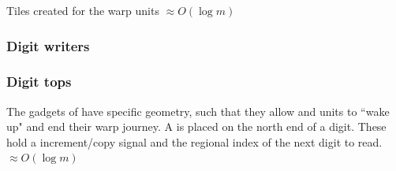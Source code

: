         Tiles created for the warp units $\approx O(\log m)$
    \subsubsection{ Digit writers }

    \subsubsection{ Digit tops }
    The {\dtop} gadgets of have specific geometry, such that they allow {\firstwarp} and
    {\secondwarp} units to ``wake up" and end their warp journey. A {\dtop} is placed on
    the north end of a digit. These hold a increment/copy signal and the regional index
    of the next digit to read. $\approx O(\log m)$
    \vspace{1cm}

